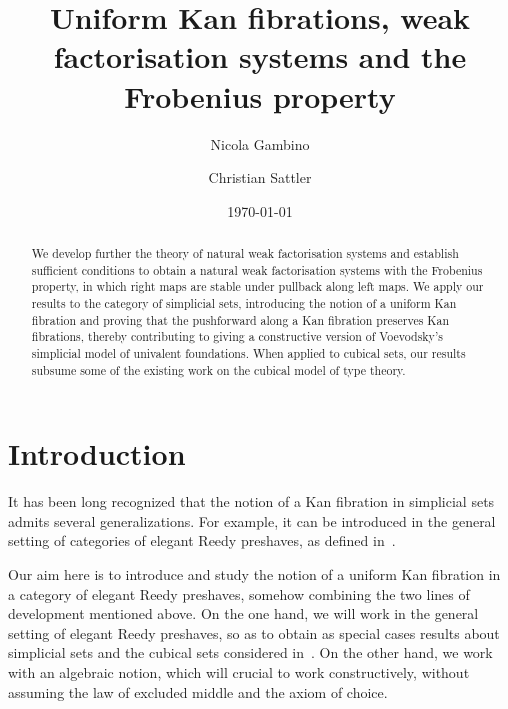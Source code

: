 \documentclass[reqno,10pt,a4paper,oneside]{amsart}
\title[Uniform Kan fibrations]{Uniform Kan fibrations, weak factorisation systems and
the Frobenius property}
\begin{document}
\begin{abstract}
We develop further the theory of natural weak factorisation systems and establish  
sufficient conditions to obtain a natural weak factorisation systems with the Frobenius
property, \ie in which right maps are stable under pullback along left maps. 
We  apply our results to the category of simplicial sets, introducing the
notion of a uniform Kan fibration and proving that the pushforward along a Kan
fibration preserves Kan fibrations, thereby contributing to giving a constructive
version of Voevodsky's simplicial model of univalent foundations. When applied
to cubical sets, our results  subsume some of the existing work on the cubical
model of type theory.
\end{abstract}

\author{Nicola Gambino}
\address{School of Mathematics, University of Leeds, Leeds LS2 9JT, UK}

\author{Christian Sattler}
\address{School of Mathematics, University of Leeds, Leeds LS2 9JT, UK}

\date{\today}

\maketitle

\tableofcontents


\section*{Introduction}

It has been long recognized that the notion of a Kan fibration in simplicial sets admits several generalizations.
For example, it can be introduced in the general setting of categories of elegant Reedy preshaves, as 
defined in~\cite{bergner-rezk-elegant}. 

Our aim here is to introduce and study the notion of a uniform Kan fibration in a category of elegant Reedy preshaves,
somehow combining the two lines of development mentioned above. On the one hand, we will work in the general setting of elegant Reedy preshaves, so as to obtain as special cases results about simplicial sets and the cubical sets 
considered in~\cite{coquand-variation}. On the other hand, we work with an algebraic notion, which will crucial to
work constructively, \ie without assuming the law of excluded middle and the axiom of choice.
\end{document}
